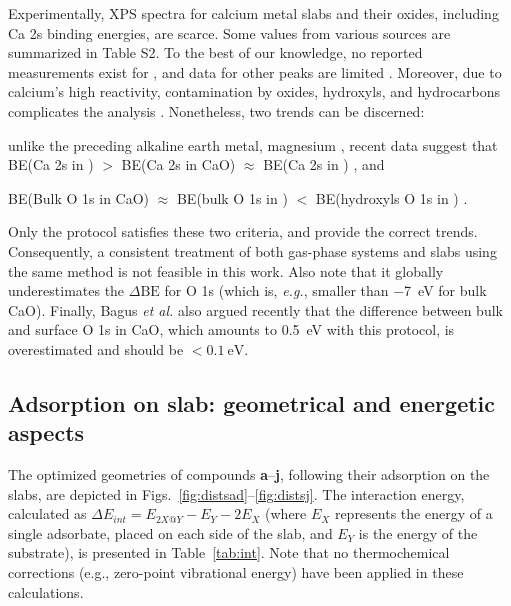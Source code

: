 \documentclass[journal=jpccck,manuscript=article]{achemso}
\def\dbe{\ensuremath{\Delta\text{BE}}}
\begin{document}
Experimentally, XPS spectra for calcium metal slabs and their oxides, including Ca 2s binding energies, are scarce. Some values from various sources are summarized in Table S2. To the best of our knowledge, no reported measurements exist for , and data for other peaks are limited \cite{franzenXPSSpectraCrystalline1977,sveinbjornssonIonicConductivityFormation2014}. Moreover, due to calcium's high reactivity, contamination by oxides, hydroxyls, and hydrocarbons complicates the analysis \cite{dupinSystematicXPSStudies2000,bebenseeAdsorptionOxygenWater2008,fujimoriInteractionWaterCaO2016a,cristXPSLibraryWebsite2021a}. Nonetheless, two trends can be discerned: \begin{inparaenum}[(i)]
	\item unlike the preceding alkaline earth metal, magnesium \cite{dobrovolskyXPSStudyInfluence2017}, recent data suggest that BE(Ca 2s in ) $>$ BE(Ca 2s in CaO) $\approx$ BE(Ca 2s in ) \cite{ochsCO2ChemisorptionCa1998,cristHandbookMonochromaticXPS2000a,cristXPSLibraryWebsite2021a}, and 
	\item BE(Bulk O 1s in CaO) $\approx$ BE(bulk O 1s in ) $<$ BE(hydroxyls O 1s in ) \cite{dupinSystematicXPSStudies2000,bebenseeAdsorptionOxygenWater2008,fujimoriInteractionWaterCaO2016a,cristXPSLibraryWebsite2021a}.
\end{inparaenum}

Only the  protocol satisfies these two criteria, and provide the correct trends. Consequently, a consistent treatment of both gas-phase systems and slabs using the same method is not feasible in this work. Also note that it globally underestimates the \dbe{} for O 1s (which is, \textit{e.g.}, smaller than \SI{-7}{\electronvolt} for bulk CaO\cite{cristXPSLibraryWebsite2021a}). Finally, Bagus \emph{et al.}\cite{bagusRevisitingSurfaceCorelevel2019} also argued recently that the difference between bulk and surface O 1s in CaO, which amounts to \SI{0.5}{\electronvolt} with this protocol, is overestimated  and should be $<\SI{0.1}{\electronvolt}$.




\clearpage

\subsection{Adsorption on slab: geometrical and energetic aspects}\label{sec:geom}

The optimized geometries of compounds \textbf{a}–\textbf{j}, following their adsorption on the slabs, are depicted in Figs.~\ref{fig:distsad}–\ref{fig:distsj}. The interaction energy, calculated as $\Delta E_{int} = E_{2X@Y} - E_Y - 2E_X$ (where $E_X$ represents the energy of a single adsorbate, placed on each side of the slab, and $E_Y$ is the energy of the substrate), is presented in Table~\ref{tab:int}. Note that no thermochemical corrections (e.g., zero-point vibrational energy) have been applied in these calculations.
\end{document}
